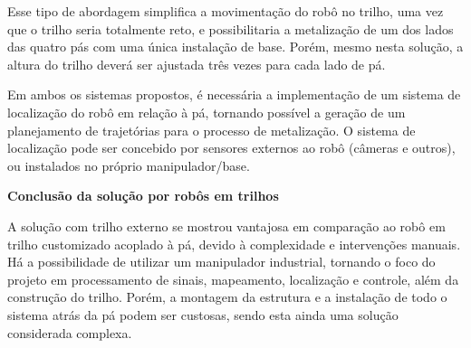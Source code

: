 Esse tipo de abordagem simplifica a movimentação do robô no
trilho, uma vez que o trilho seria totalmente reto, e possibilitaria a
metalização de um dos lados das quatro pás com uma única instalação de base.
Porém, mesmo nesta solução, a altura do trilho deverá ser ajustada três vezes para
cada lado de pá.

Em ambos os sistemas propostos, é necessária a implementação de um sistema de
localização do robô em relação à pá, tornando possível a geração de um
planejamento de trajetórias para o processo de metalização. O sistema de
localização pode ser concebido por sensores externos
ao robô (câmeras e outros), ou instalados no próprio manipulador/base.

\textbf{Conclusão da solução por robôs em trilhos}

A solução com trilho externo se mostrou vantajosa em comparação ao robô em
trilho customizado acoplado à pá, devido à complexidade e intervenções
manuais. Há a possibilidade de utilizar um manipulador industrial, tornando o
foco do projeto em processamento de sinais, mapeamento, localização e controle,
além da construção do trilho. Porém, a montagem da estrutura e a instalação de
todo o sistema atrás da pá podem ser custosas, sendo esta ainda uma solução
considerada complexa.
